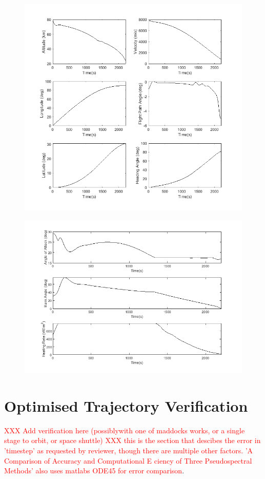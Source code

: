 \begin{figure}[H]
\centering
\includegraphics[width=0.7\linewidth]{figures/A1_uncertainty-analysis/SpaceShuttleq1}
\caption{}
\label{fig:SpaceShuttleq1}
\end{figure}
\begin{figure}[H]
\centering
\includegraphics[width=0.7\linewidth]{figures/A1_uncertainty-analysis/SpaceShuttleq2}
\caption{}
\label{fig:SpaceShuttleq2}
\end{figure}


\section{Optimised Trajectory Verification}

\textcolor{red}{XXX Add verification here (possiblywith one of maddocks works, or a single stage to orbit, or space shuttle)}
\textcolor{red}{XXX  this is the section that descibes the error in 'timestep' as requested by reviewer, though there are multiple other factors. 'A Comparison of Accuracy and Computational E ciency of Three Pseudospectral Methods' also uses matlabs ODE45 for error comparison}.

